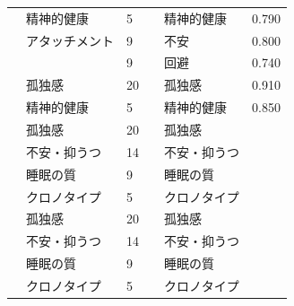 \begin{landscape}
\begin{longtable}{p{2cm}p{2cm}p{2cm}p{6cm}p{2cm}p{2cm}}
                                 & 精神的健康                            & 5   &                                                     & 精神的健康                & 0.790   \\
                                 & アタッチメント                          & 9   &                                                     & 不安                   & 0.800   \\
                                 &                                  & 9   &                                                     & 回避                   & 0.740   \\
                                 & 孤独感                              & 20  &                                                     & 孤独感                  & 0.910   \\
                                 & 精神的健康                            & 5   &                                                     & 精神的健康                & 0.850   \\
        \citet{Sugiyama202192}   & 孤独感                              & 20  &                                                     & 孤独感                  &         \\
                                 & 不安・抑うつ                           & 14  &                                                     & 不安・抑うつ               &         \\
                                 & 睡眠の質                             & 9   &                                                     & 睡眠の質                 &         \\
                                 & クロノタイプ                           & 5   &                                                     & クロノタイプ               &         \\
                                 & 孤独感                              & 20  &                                                     & 孤独感                  &         \\
                                 & 不安・抑うつ                           & 14  &                                                     & 不安・抑うつ               &         \\
                                 & 睡眠の質                             & 9   &                                                     & 睡眠の質                 &         \\
                                 & クロノタイプ                           & 5   &                                                     & クロノタイプ               &         \\

\end{longtable}
\end{landscape}
